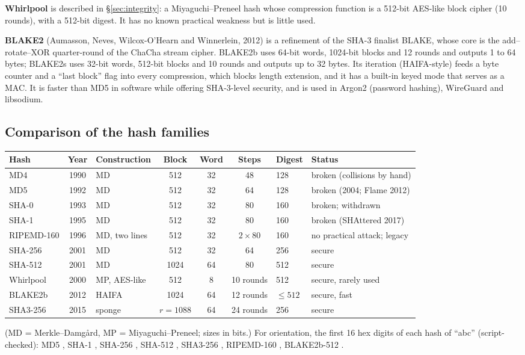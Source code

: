 \textbf{Whirlpool} is described in \S\ref{sec:integrity}: a Miyaguchi--Preneel hash whose compression function is a 512-bit AES-like block cipher (10 rounds), with a 512-bit digest. It has no known practical weakness but is little used.

\textbf{BLAKE2} (Aumasson, Neves, Wilcox-O'Hearn and Winnerlein, 2012) is a refinement of the SHA-3 finalist BLAKE, whose core is the add--rotate--XOR quarter-round of the ChaCha stream cipher. BLAKE2b uses 64-bit words, 1024-bit blocks and 12 rounds and outputs 1 to 64 bytes; BLAKE2s uses 32-bit words, 512-bit blocks and 10 rounds and outputs up to 32 bytes. Its iteration (HAIFA-style) feeds a byte counter and a ``last block'' flag into every compression, which blocks length extension, and it has a built-in keyed mode that serves as a MAC. It is faster than MD5 in software while offering SHA-3-level security, and is used in Argon2 (password hashing), WireGuard and libsodium.

\subsection{Comparison of the hash families \hot\new}

\begin{center}\small
\setlength{\tabcolsep}{4pt}
\begin{tabular}{@{}lclcccll@{}}
\toprule
Hash & Year & Construction & Block & Word & Steps & Digest & Status\\
\midrule
MD4 & 1990 & MD & 512 & 32 & 48 & 128 & broken (collisions by hand)\\
MD5 & 1992 & MD & 512 & 32 & 64 & 128 & broken (2004; Flame 2012)\\
SHA-0 & 1993 & MD & 512 & 32 & 80 & 160 & broken; withdrawn\\
SHA-1 & 1995 & MD & 512 & 32 & 80 & 160 & broken (SHAttered 2017)\\
RIPEMD-160 & 1996 & MD, two lines & 512 & 32 & $2 \times 80$ & 160 & no practical attack; legacy\\
SHA-256 & 2001 & MD & 512 & 32 & 64 & 256 & secure\\
SHA-512 & 2001 & MD & 1024 & 64 & 80 & 512 & secure\\
Whirlpool & 2000 & MP, AES-like & 512 & 8 & 10 rounds & 512 & secure, rarely used\\
BLAKE2b & 2012 & HAIFA & 1024 & 64 & 12 rounds & $\le 512$ & secure, fast\\
SHA3-256 & 2015 & sponge & $r = 1088$ & 64 & 24 rounds & 256 & secure\\
\bottomrule
\end{tabular}
\end{center}
(MD = Merkle--Damg\aa rd, MP = Miyaguchi--Preneel; sizes in bits.) For orientation, the first 16 hex digits of each hash of ``abc'' (script-checked): MD5 , SHA-1 , SHA-256 , SHA-512 , SHA3-256 , RIPEMD-160 , BLAKE2b-512 .

